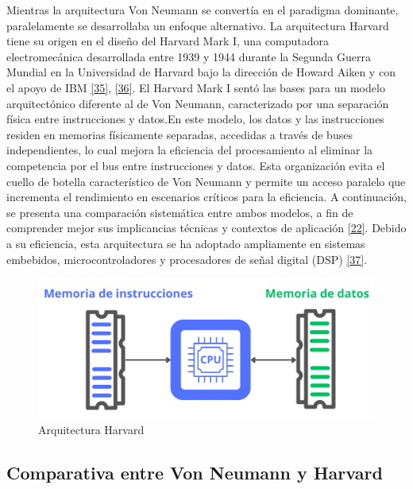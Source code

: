 \documentclass[12pt,oneside]{templates/unerthesis}
\begin{document}
Mientras la arquitectura Von Neumann se convertía en el paradigma dominante, paralelamente se desarrollaba un enfoque alternativo. La arquitectura Harvard tiene su origen en el diseño del Harvard Mark I, una computadora electromecánica desarrollada entre 1939 y 1944 durante la Segunda Guerra Mundial en la Universidad de Harvard bajo la dirección de Howard Aiken y con el apoyo de IBM \protect\hyperlink{ref-ceruzzi_history_2003}{{[}35{]}}, \protect\hyperlink{ref-williams1998history}{{[}36{]}}. El Harvard Mark I sentó las bases para un modelo arquitectónico diferente al de Von Neumann, caracterizado por una separación física entre instrucciones y datos.En este modelo, los datos y las instrucciones residen en memorias físicamente separadas, accedidas a través de buses independientes, lo cual mejora la eficiencia del procesamiento al eliminar la competencia por el bus entre instrucciones y datos. Esta organización evita el cuello de botella característico de Von Neumann y permite un acceso paralelo que incrementa el rendimiento en escenarios críticos para la eficiencia. A continuación, se presenta una comparación sistemática entre ambos modelos, a fin de comprender mejor sus implicancias técnicas y contextos de aplicación \protect\hyperlink{ref-tanenbaum_structured_2016}{{[}22{]}}. Debido a su eficiencia, esta arquitectura se ha adoptado ampliamente en sistemas embebidos, microcontroladores y procesadores de señal digital (DSP) \protect\hyperlink{ref-noergaard2012embedded}{{[}37{]}}.

\begin{figure}

{\centering \includegraphics[width=0.85\linewidth]{images/harvard} 

}

\caption{Arquitectura Harvard}\label{fig:harvard}
\end{figure}

\hypertarget{comparativa-entre-von-neumann-y-harvard}{%
\subsection{Comparativa entre Von Neumann y Harvard}\label{comparativa-entre-von-neumann-y-harvard}}
\end{document}
